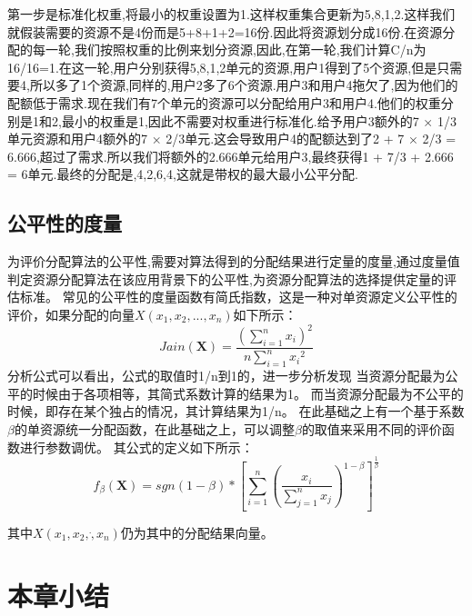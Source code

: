 第一步是标准化权重,将最小的权重设置为1.这样权重集合更新为5,8,1,2.这样我们就假装需要的资源不是4份而是5+8+1+2=16份.因此将资源划分成16份.在资源分配的每一轮,我们按照权重的比例来划分资源,因此,在第一轮,我们计算C/n为16/16=1.在这一轮,用户分别获得5,8,1,2单元的资源,用户1得到了5个资源,但是只需要4,所以多了1个资源,同样的,用户2多了6个资源.用户3和用户4拖欠了,因为他们的配额低于需求.现在我们有7个单元的资源可以分配给用户3和用户4.他们的权重分别是1和2,最小的权重是1,因此不需要对权重进行标准化.给予用户3额外的7 × 1/3单元资源和用户4额外的7 × 2/3单元.这会导致用户4的配额达到了2 + 7 × 2/3 = 6.666,超过了需求.所以我们将额外的2.666单元给用户3,最终获得1 + 7/3 + 2.666 = 6单元.最终的分配是,4,2,6,4,这就是带权的最大最小公平分配.
\subsection{公平性的度量}
为评价分配算法的公平性,需要对算法得到的分配结果进行定量的度量,通过度量值判定资源分配算法在该应用背景下的公平性,为资源分配算法的选择提供定量的评估标准。
常见的公平性的度量函数有简氏指数，这是一种对单资源定义公平性的评价，如果分配的向量$X({x}_{1},{x}_{2},...,{x}_{n})$如下所示：
\begin{equation}
Jain(\textbf{X}) = \frac{{(\sum_{i=1}^{n}{x}_{i})}^{2}}{n\sum_{i=1}^{n}{{x}_{i}}^{2}}
\end{equation}
分析公式可以看出，公式的取值时1/n到1的，进一步分析发现
当资源分配最为公平的时候由于各项相等，其简式系数计算的结果为1。
而当资源分配最为不公平的时候，即存在某个独占的情况，其计算结果为1/n。
在此基础之上有一个基于系数$\beta$的单资源统一分配函数，在此基础之上，可以调整$\beta$的取值来采用不同的评价函数进行参数调优。
其公式的定义如下所示：
\begin{equation}
{f}_{\beta} (\textbf{X})= sgn(1-\beta)*{\left[\sum_{i=1}^{n}{\left(\frac{{x}_{i}}{\sum_{j=1}^{n}{x}_{j}} \right)}^{1 - \beta} \right]}^{\frac{1}{\beta}}
\end{equation}




其中$X({x}_{1},{x}_{2},\dot,{x}_{n})$仍为其中的分配结果向量。


\section{本章小结}
